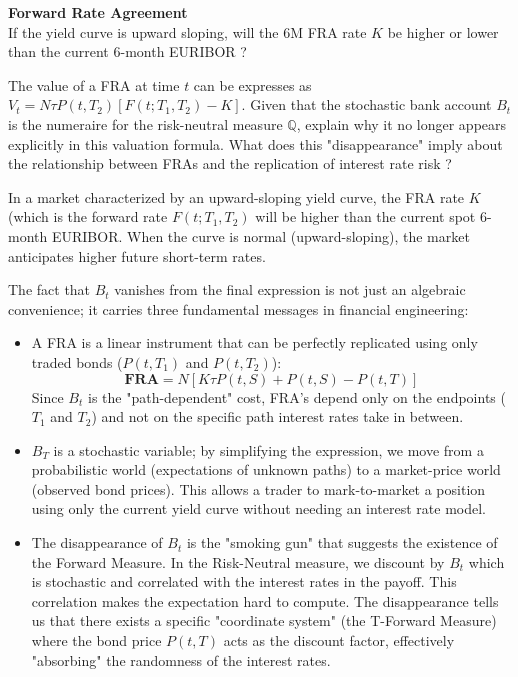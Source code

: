 \documentclass[12pt,a4paper]{exam}
\begin{document}
\begin{questions}
\question \textbf{Forward Rate Agreement} \\
If the yield curve is upward sloping, will the 6M FRA rate $K$ be higher or lower than the current 6-month EURIBOR ?

The value of a FRA at time $t$ can be expresses as $V_t=N\tau P(t, T_2)[F(t;T_1, T_2)-K]$. Given that the stochastic bank account $B_t$ is the numeraire for the risk-neutral measure $\mathbb{Q}$, explain why it no longer appears explicitly in this valuation formula. What does this "disappearance" imply about the relationship between FRAs and the replication of interest rate risk ?

\begin{solution}
In a market characterized by an upward-sloping yield curve, the FRA rate $K$ (which is the forward rate $F(t; T_1, T_2)$ will be higher than the current spot 6-month EURIBOR. When the curve is normal (upward-sloping), the market anticipates higher future short-term rates.

The fact that $B_t$ vanishes from the final expression is not just an algebraic convenience; it carries three fundamental messages in financial engineering:

\begin{itemize}
	\item A FRA is a linear instrument that can be perfectly replicated using only traded bonds ($P(t,T_1)$ and $P(t,T_2)$):
	\begin{equation*}
	\textbf{FRA} = N[K\tau P(t, S) + P(t, S) - P(t, T)]
	\end{equation*}
	 Since $B_t$ is the "path-dependent" cost, FRA's depend only on the endpoints ($T_1$ and $T_2$) and not on the specific path interest rates take in between.
	\item $B_{T}$ is a stochastic variable; by simplifying the expression, we move from a probabilistic world (expectations of unknown paths) to a market-price world (observed bond prices). This allows a trader to mark-to-market a position using only the current yield curve without needing an interest rate model.
	\item The disappearance of $B_t$ is the "smoking gun" that suggests the existence of the Forward Measure. In the Risk-Neutral measure, we discount by $B_t$ which is stochastic and correlated with the interest rates in the payoff. This correlation makes the expectation hard to compute. The disappearance tells us that there exists a specific "coordinate system" (the T-Forward Measure) where the bond price $P(t,T)$ acts as the discount factor, effectively "absorbing" the randomness of the interest rates.
\end{itemize}
\end{solution}


\end{questions}
\end{document}
